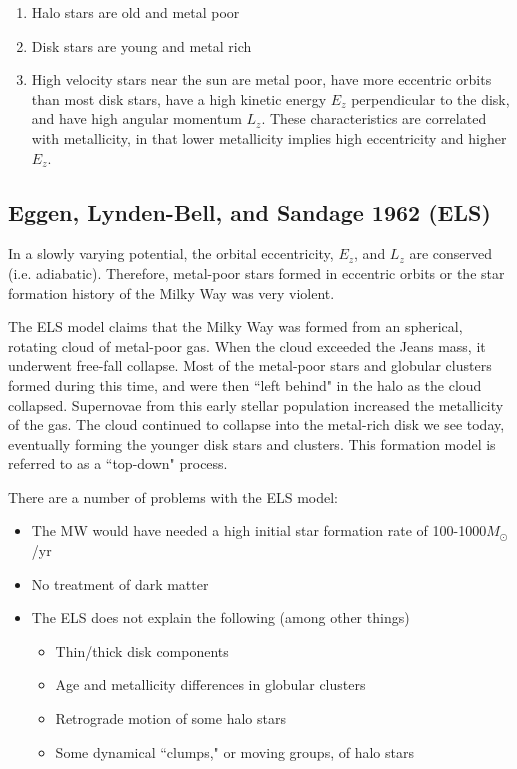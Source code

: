 \begin{enumerate}
\item Halo stars are old and metal poor
\item Disk stars are young and metal rich
\item High velocity stars near the sun are metal poor, have more eccentric orbits than most disk stars, have a high kinetic energy $E_z$ perpendicular to the disk, and have high angular momentum $L_z$. These characteristics are correlated with metallicity, in that lower metallicity implies high eccentricity and higher $E_z$. 
\end{enumerate}

\subsection{Eggen, Lynden-Bell, and Sandage 1962 (ELS)}

In a slowly varying potential, the orbital eccentricity, $E_z$, and $L_z$ are conserved (i.e. adiabatic). Therefore, metal-poor stars formed in eccentric orbits or the star formation history of the Milky Way was very violent. 

The ELS model claims that the Milky Way was formed from an spherical, rotating cloud of metal-poor gas. When the cloud exceeded the Jeans mass, it underwent free-fall collapse. Most of the metal-poor stars and globular clusters formed during this time, and were then ``left behind" in the halo as the cloud collapsed. Supernovae from this early stellar population increased the metallicity of the gas. The cloud continued to collapse into the metal-rich disk we see today, eventually forming the younger disk stars and clusters. This formation model is referred to as a ``top-down" process.

There are a number of problems with the ELS model:
\begin{itemize}
\item The MW would have needed a high initial star formation rate of 100-1000$M_\odot$/yr
\item No treatment of dark matter
\item The ELS does not explain the following (among other things)

\begin{itemize}
\item Thin/thick disk components
\item Age and metallicity differences in globular clusters
\item Retrograde motion of some halo stars
\item Some dynamical ``clumps," or moving groups, of halo stars
\end{itemize}

\end{itemize}

